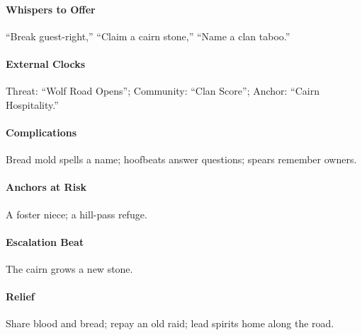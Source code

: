 \paragraph{Whispers to Offer} ``Break guest-right,'' ``Claim a cairn stone,'' ``Name a clan taboo.''
\paragraph{External Clocks} Threat: ``Wolf Road Opens''; Community: ``Clan Score''; Anchor: ``Cairn Hospitality.''
\paragraph{Complications} Bread mold spells a name; hoofbeats answer questions; spears remember owners.
\paragraph{Anchors at Risk} A foster niece; a hill-pass refuge.
\paragraph{Escalation Beat} The cairn grows a new stone.
\paragraph{Relief} Share blood and bread; repay an old raid; lead spirits home along the road.
